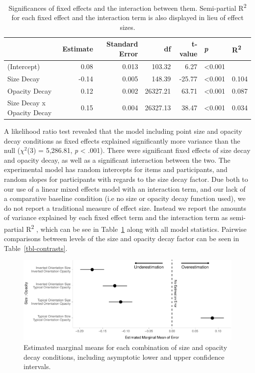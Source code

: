 \documentclass[manuscript, review, anonymous, screen]{acmart}
\begin{document}
\hypertarget{tbl-sig}{}
\begin{table}
\caption{\label{tbl-sig}Significances of fixed effects and the interaction between them.
Semi-partial R\textsuperscript{2} for each fixed effect and the
interaction term is also displayed in lieu of effect sizes. }\tabularnewline

\centering
\begin{tabular}{lrrrrll}
\toprule
  & Estimate & Standard Error & df & t-value & \textit{p} & R\textsuperscript{2}\\
\midrule
(Intercept) & 0.08 & 0.013 & 103.32 & 6.27 & <0.001 & \\
Size Decay & -0.14 & 0.005 & 148.39 & -25.77 & <0.001 & 0.104\\
Opacity Decay & 0.12 & 0.002 & 26327.21 & 63.71 & <0.001 & 0.087\\
Size Decay x Opacity Decay & 0.15 & 0.004 & 26327.13 & 38.47 & <0.001 & 0.034\\
\bottomrule
\end{tabular}
\end{table}

A likelihood ratio test revealed that the model including point size and
opacity decay conditions as fixed effects explained significantly more
variance than the null (\(\chi^2\)(3) = 5,286.81, \emph{p} \textless{}
.001). There were significant fixed effects of size decay and opacity
decay, as well as a significant interaction between the two. The
experimental model has random intercepts for items and participants, and
random slopes for participants with regards to the size decay factor.
Due both to our use of a linear mixed effects model with an interaction
term, and our lack of a comparative baseline condition (i.e no size or
opacity decay function used), we do not report a traditional measure of
effect size. Instead we report the amounts of variance explained by each
fixed effect term and the interaction term as semi-partial
R\textsuperscript{2} \citep{nakagawa_2013}, which can be see in
Table~\ref{tbl-sig} along with all model statistics. Pairwise
comparisons between levels of the size and opacity decay factor can be
seen in Table~\ref{tbl-contrasts}.

\begin{figure}

{\centering \includegraphics[width=1\textwidth,height=\textheight]{size_and_opacity_files/figure-pdf/fig-emm-plot-1.pdf}

}

\caption{\label{fig-emm-plot}Estimated marginal means for each
combination of size and opacity decay conditions, including asymptotic
lower and upper confidence intervals.}

\end{figure}
\end{document}
